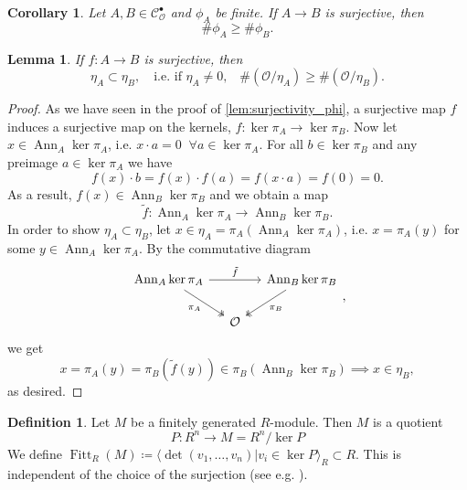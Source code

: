 \documentclass{article}
\theoremstyle{plain}%
\newtheorem{lemma}[theorem]{Lemma}
\newtheorem{corollary}[theorem]{Corollary}
\theoremstyle{definition}
\newtheorem{definition}[theorem]{Definition}
\theoremstyle{remark}
\newcommand{\cob}{\mathcal{C}_\mathcal{O}^\bullet}
\newcommand{\ann}{\operatorname{Ann}}
\newcommand{\fitt}{\operatorname{Fitt}}
\begin{document}
\begin{corollary}\label{cor:surjectivity_phi}
    Let \(A, B\in \cob\) and \(\phi_A\) be finite. %
    If \(A \to B\) is surjective, then \[\# \phi_A \geq \# \phi_B.\]
\end{corollary}

\begin{lemma}\label{lem:surjectivity_eta}
    If \(f \colon A \to B\) is surjective, then
    \begin{equation*}
        \eta_A \subset \eta_B, \quad \text{i.e. if \(\eta_A \neq 0\),}\quad \#(\mathcal{O}/\eta_A) \geq \#(\mathcal{O}/\eta_B).  
    \end{equation*}
\end{lemma}
\begin{proof}
    As we have seen in the proof of \cref{lem:surjectivity_phi}, a surjective map \(f\) induces a surjective
    map on the kernels, \(f\colon \ker \pi_A \to \ker\pi_B\).
    Now let \(x \in \ann_A \ker \pi_A\), i.e. \(x \cdot a = 0\;\; \forall a \in \ker \pi_A\).
    For all \(b \in \ker \pi_B\) and any preimage \(a \in \ker \pi_A\) we have
    \[
        f(x) \cdot b = f(x) \cdot f(a) = f(x \cdot a) = f(0) = 0.
    \]
    As a result, \(f(x) \in \ann_B\ker \pi_B\) and we obtain a map
    \[
        \tilde f\colon\ann_A\ker \pi_A \to \ann_B \ker \pi_B.  
    \]
    In order to show \(\eta_A \subset \eta_B\), let \(x \in \eta_A = \pi_A(\ann_A \ker \pi_A)\), i.e.
    \(x = \pi_A(y)\) for some \(y \in \ann_A \ker \pi_A\). By the commutative diagram
    \[
    \begin{tikzcd}[column sep=small]
        \ann_A \ker \pi_A \arrow[rr, "\tilde f"] \arrow [dr, "\pi_A", swap, twoheadrightarrow] 
        & & \ann_B \ker \pi_B \arrow [dl, "\pi_B", twoheadrightarrow]\\
        & \mathcal{O} &
    \end{tikzcd},
    \]
    we get
    \[
        x = \pi_A(y) = \pi_B(\tilde f(y)) \in \pi_B(\ann_B \ker \pi_B) \implies x \in \eta_B,
    \]
    as desired.
\end{proof}

\begin{definition}
    Let \(M\) be a finitely generated \(R\)-module. Then \(M\) is a quotient
    \[
        P \colon R^n \longrightarrow M = R^n/\ker P
    \]
    We define \(\fitt_R(M) \coloneqq \langle \det(v_1, \dots, v_n) | v_i \in \ker P \rangle_R \subset R\).
    This is independent of the choice of the surjection 
    (see e.g. \cite[\href{https://stacks.math.columbia.edu/tag/07Z6}{tag 07Z6}]{stacks-project}).
\end{definition}
\end{document}
